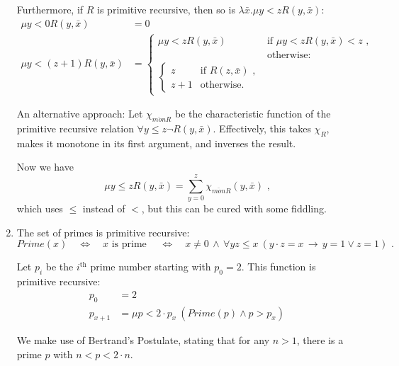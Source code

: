 \documentclass[a4paper,11pt]{article}
\begin{document}
\begin{enumerate}
Furthermore, if $R$ is primitive recursive, then so is $\lambda \bar{x}. \mu y \! < \! z R(y, \bar{x})$:
\begin{align*}
  \mu y \! < \! 0 R(y, \bar{x})             &= 0\\
  \mu y \! < \! (z \! + \! 1) R(y, \bar{x}) &=
  \begin{cases}
    \mu y \! < \! z R(y, \bar{x}) & \text{if $\mu y \! < \! z R(y, \bar{x}) < z$ ,}\\
                                  & \text{otherwise:}\\
    \begin{cases}
       z     & \text{if $R(z, \bar{x})$ ,}\\
       z + 1 & \text{otherwise.}
    \end{cases}
  \end{cases}
\end{align*}

An alternative approach: Let $\chi_{\overline{mon}R}$ be the characteristic function of the
primitive recursive relation $\forall y \! \leq \! z \neg R(y, \bar{x})$.
Effectively, this takes $\chi_R$, makes it monotone in its first argument,
and inverses the result.

Now we have
\begin{equation*}
  \mu y \! \leq \! z R(y, \bar{x}) = \sum^{z}_{y=0} \chi_{\overline{mon}R}(y, \bar{x}) \text{ ,}
\end{equation*}
which uses $\leq$ instead of $<$, but this can be cured with some fiddling.


\item %
The set of primes is primitive recursive:
\begin{equation*}
  Prime(x) \quad \Leftrightarrow \quad
  x \text{ is prime } \quad \Leftrightarrow \quad
  x \neq 0 \, \wedge \, \forall y z \! \leq \! x \: (y \! \cdot \! z = x \, \rightarrow \, y = 1 \vee z = 1) \text{ .}
\end{equation*}

Let $p_i$ be the $i^{\text{th}}$ prime number starting with $p_0 = 2$.
This function is primitive recursive:
\begin{align*}
  p_0    &= 2 \\
  p_{x+1} &= \mu p \! < \! 2 \! \cdot \! p_x \: (Prime(p) \wedge p > p_x)
\end{align*}

We make use of Bertrand's Postulate, stating that for any $n>1$, there is
a prime $p$ with $n < p < 2\! \cdot n$.


\end{enumerate}
\end{document}

